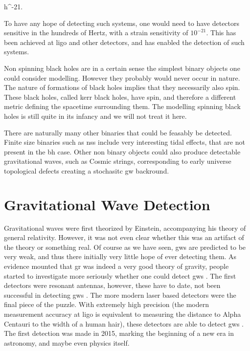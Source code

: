 \documentclass[
  10pt,
  a4paper,
  DIV=11,
  numbers=noendperiod,
  oneside]{scrreprt}
\let\[\relax \let\]\relax %
\DeclareRobustCommand{\[}{\begin{equation}}
\DeclareRobustCommand{\]}{\end{equation}}
\begin{document}
\[
h^{-21}.
\]

To have any hope of detecting such systems, one would need to have
detectors sensitive in the hundreds of Hertz, with a strain sensitivity
of \(10^{-21}\). This has been achieved at \gls{ligo} and other
detectors, and has enabled the detection of such systems.

Non spinning black holes are in a certain sense the simplest binary
objects one could consider modelling. However they probably would never
occur in nature. The nature of formations of black holes implies that
they necessarily also spin. These black holes, called kerr black holes,
have spin, and therefore a different metric defining the spacetime
surrounding them. The modelling spinning black holes is still quite in
its infancy and we will not treat it here.

There are naturally many other binaries that could be feasably be
detected. Finite size binaries such as \glspl{ns} include very
interesting tidal effects, that are not present in the \gls{bh} case.
Other non binary objects could also produce detectable gravitational
waves, such as Cosmic strings, corresponding to early universe
topological defects creating a stochasitc \gls{gw} backround.


\hypertarget{gravitational-wave-detection}{%
\chapter{Gravitational Wave
Detection}\label{gravitational-wave-detection}}

Gravitational waves were first theorized by Einstein, accompanying his
theory of general relativity. However, it was not even clear whether
this was an artifact of the theory or something real. Of course as we
have seen, \glspl{gw} are predicted to be very weak, and thus there
initially very little hope of ever detecting them. As evidence mounted
that \gls{gr} was indeed a very good theory of gravity, people started
to investigate more seriously whether one could detect \glspl{gw} . The
first detectors were resonant antennas, however, these have to date, not
been successful in detecting \glspl{gw} . The more modern laser based
detectors were the final piece of the puzzle. With extremely high
precision (the modern measurement accuracy at \gls{ligo} is equivalent
to measuring the distance to Alpha Centauri to the width of a human
hair), these detectors are able to detect \glspl{gw} . The first
detection was made in 2015, marking the beginning of a new era in
astronomy, and maybe even physics itself.
\end{document}
